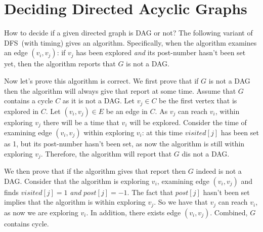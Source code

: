 \section*{Deciding Directed Acyclic Graphs}

How to decide if a given directed graph is DAG or not?
The following variant of DFS~(with timing) gives an algorithm.
Specifically, when the algorithm examines an edge $(v_i, v_j)$:
if $v_j$ has been explored \emph{and} its post-number hasn't been set yet,
then the algorithm reports that $G$ is not a DAG.

\begin{minipage}{0.8\textwidth}
	\xxx
	\xxx
	\xxx
	\xxx
	\xxx
	\xxx
	\xxx
	\xxx
	\xxx
\end{minipage}

\begin{minipage}{0.8\textwidth}
	\xxx
	\xxx
	\xxx
	\xxx
	\xxx
	\xxx
	\aac {\textcolor{red}{else if ($post[j] = -1$): report ``$G$ is not a DAG''};}\xxx
	\xxx
	\xxx
	\xxx
	\xxx
\end{minipage}

Now let's prove this algorithm is correct.
We first prove that if $G$ is not a DAG then the algorithm will always give that report at some time.
Assume that $G$ contains a cycle $C$ as it is not a DAG.
Let $v_j \in C$ be the first vertex that is explored in $C$.
Let $(v_i, v_j) \in E$ be an edge in $C$.
As $v_j$ can reach $v_i$, within exploring $v_j$ there will be a time that $v_i$ will be explored.
Consider the time of examining edge $(v_i,v_j)$ within exploring $v_i$: at this time $visited[j]$ has been set as 1,
but its post-number hasn't been set, as now the algorithm is still within exploring $v_j$.
Therefore, the algorithm will report that $G$ dis not a DAG. 

We then prove that if the algorithm gives that report then $G$ indeed is not a DAG.
Consider that the algorithm is exploring $v_i$, examining edge $(v_i, v_j)$ and 
finds $visited[j] = 1$ \emph{and} $post[j] = -1$.
The fact that $post[j]$ hasn't been set implies that the algorithm is within exploring $v_j$.
So we have that $v_j$ can reach $v_i$, as now we are exploring $v_i$.
In addition, there exists edge $(v_i, v_j)$. Combined, $G$ contains cycle.

